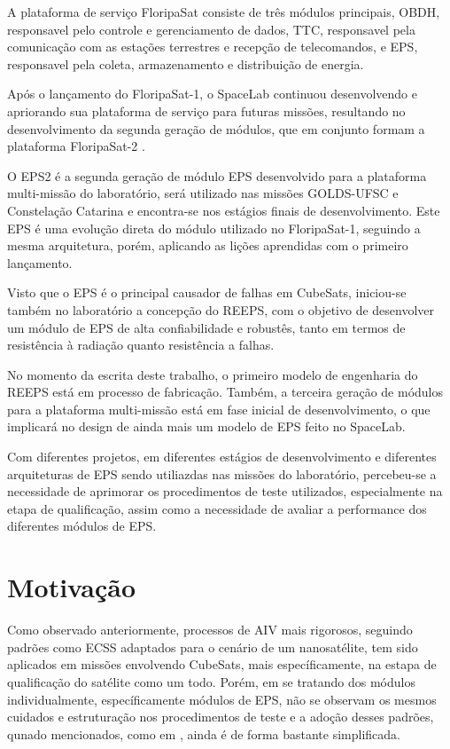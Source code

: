 A plataforma de serviço FloripaSat consiste de três módulos principais, \gls{OBDH}, responsavel pelo controle e gerenciamento de dados, \gls{TTC}, responsavel pela comunicação com as estações terrestres e recepção de telecomandos, e \gls{EPS}, responsavel pela coleta, armazenamento e distribuição de energia.

Após o lançamento do FloripaSat-1, o SpaceLab continuou desenvolvendo e apriorando sua plataforma de serviço para futuras missões, resultando no desenvolvimento da segunda geração de módulos, que em conjunto formam a plataforma FloripaSat-2 \cite{floripasat2}.

O \gls{EPS2} é a segunda geração de módulo \gls{EPS} desenvolvido para a plataforma multi-missão do laboratório, será utilizado nas missões GOLDS-UFSC e Constelação Catarina e encontra-se nos estágios finais de desenvolvimento. Este \gls{EPS} é uma evolução direta do módulo utilizado no FloripaSat-1, seguindo a mesma arquitetura, porém, aplicando as lições aprendidas com o primeiro lançamento.

Visto que o \gls{EPS} é o principal causador de falhas em CubeSats, iniciou-se também no laboratório a concepção do \gls{REEPS}, com o objetivo de desenvolver um módulo de \gls{EPS} de alta confiabilidade e robustês, tanto em termos de resistência à radiação quanto resistência a falhas.

No momento da escrita deste trabalho, o primeiro modelo de engenharia do \gls{REEPS} está em processo de fabricação.
Também, a terceira geração de módulos para a plataforma multi-missão está em fase inicial de desenvolvimento, o que implicará no design de ainda mais um modelo de \gls{EPS} feito no SpaceLab.

Com diferentes projetos, em diferentes estágios de desenvolvimento e diferentes arquiteturas de \gls{EPS} sendo utiliazdas nas missões do laboratório, percebeu-se a necessidade de aprimorar os procedimentos de teste utilizados, especialmente na etapa de qualificação, assim como a necessidade de avaliar a performance dos diferentes módulos de \gls{EPS}.

\section{Motivação}\label{sec:intro-motivacao}

Como observado anteriormente, processos de \gls{AIV} mais rigorosos, seguindo padrões como \gls{ECSS} adaptados para o cenário de um nanosatélite, tem sido aplicados em missões envolvendo CubeSats, mais específicamente, na estapa de qualificação do satélite como um todo.
Porém, em se tratando dos módulos individualmente, específicamente módulos de EPS, não se observam os mesmos cuidados e estruturação nos procedimentos de teste e a adoção desses padrões, qunado mencionados, como em \textcite{mist-eps}, ainda é de forma bastante simplificada.


